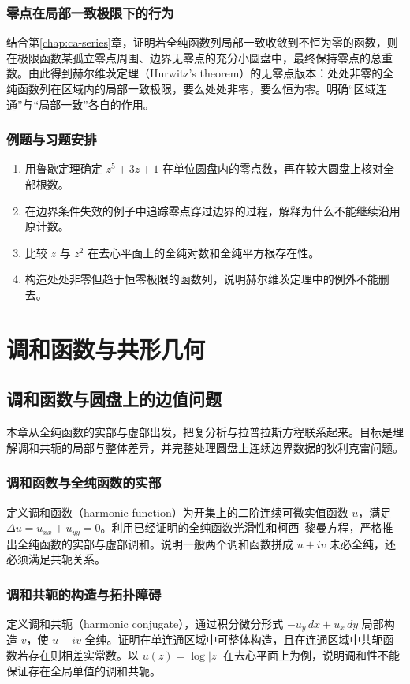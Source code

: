 \documentclass[UTF8,12pt,a4paper,fontset=fandol]{ctexbook}
\begin{document}
\section{零点在局部一致极限下的行为}
结合第\ref{chap:ca-series}章，证明若全纯函数列局部一致收敛到不恒为零的函数，则在极限函数某孤立零点周围、边界无零点的充分小圆盘中，最终保持零点的总重数。由此得到赫尔维茨定理（Hurwitz's theorem）的无零点版本：处处非零的全纯函数列在区域内的局部一致极限，要么处处非零，要么恒为零。明确“区域连通”与“局部一致”各自的作用。

\section{例题与习题安排}
\begin{enumerate}
  \item 用鲁歇定理确定 $z^5+3z+1$ 在单位圆盘内的零点数，再在较大圆盘上核对全部根数。
  \item 在边界条件失效的例子中追踪零点穿过边界的过程，解释为什么不能继续沿用原计数。
  \item 比较 $z$ 与 $z^2$ 在去心平面上的全纯对数和全纯平方根存在性。
  \item 构造处处非零但趋于恒零极限的函数列，说明赫尔维茨定理中的例外不能删去。
\end{enumerate}

\part{调和函数与共形几何}

\chapter{调和函数与圆盘上的边值问题}
\label{chap:ca-harmonic}

本章从全纯函数的实部与虚部出发，把复分析与拉普拉斯方程联系起来。目标是理解调和共轭的局部与整体差异，并完整处理圆盘上连续边界数据的狄利克雷问题。

\section{调和函数与全纯函数的实部}
定义调和函数（harmonic function）为开集上的二阶连续可微实值函数 $u$，满足 $\Delta u=u_{xx}+u_{yy}=0$。利用已经证明的全纯函数光滑性和柯西--黎曼方程，严格推出全纯函数的实部与虚部调和。说明一般两个调和函数拼成 $u+iv$ 未必全纯，还必须满足共轭关系。

\section{调和共轭的构造与拓扑障碍}
定义调和共轭（harmonic conjugate），通过积分微分形式 $-u_y\,dx+u_x\,dy$ 局部构造 $v$，使 $u+iv$ 全纯。证明在单连通区域中可整体构造，且在连通区域中共轭函数若存在则相差实常数。以 $u(z)=\log|z|$ 在去心平面上为例，说明调和性不能保证存在全局单值的调和共轭。
\end{document}
